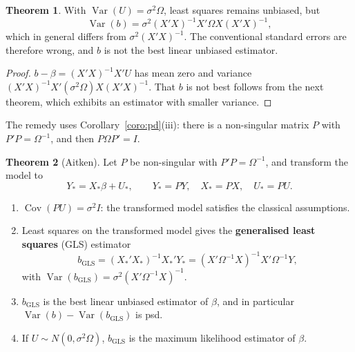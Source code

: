 \documentclass[11pt,a4paper]{article}
\numberwithin{equation}{section}
\DeclareMathOperator{\Var}{Var}
\DeclareMathOperator{\Cov}{Cov}
\theoremstyle{definition}
\newtheorem{thm}{Theorem}[subsection]
\begin{document}
\begin{thm}
\label{thm:olsnonsph}
With $\Var(U) = \sigma^2\Omega$, least squares remains unbiased, but
\[
\Var(b) = \sigma^2(X'X)^{-1}X'\Omega X(X'X)^{-1} ,
\]
which in general differs from $\sigma^2(X'X)^{-1}$. The conventional standard errors are therefore wrong, and $b$ is not the best linear unbiased estimator.
\end{thm}

\begin{proof}
$b - \beta = (X'X)^{-1}X'U$ has mean zero and variance $(X'X)^{-1}X'(\sigma^2\Omega)X(X'X)^{-1}$. That $b$ is not best follows from the next theorem, which exhibits an
estimator with smaller variance.
\end{proof}

The remedy uses Corollary~\ref{coro:pd}(iii): there is a non-singular matrix $P$ with $P'P = \Omega^{-1}$, and then $P\Omega P' = I$.

\begin{thm}[Aitken]
\label{thm:aitken}
Let $P$ be non-singular with $P'P = \Omega^{-1}$, and transform the model to
\[
Y_* = X_*\beta + U_*, \qquad Y_* = PY,\quad X_* = PX,\quad U_* = PU .
\]
\begin{enumerate}[label=(\roman*)]
\item $\Cov(PU) = \sigma^2I$: the transformed model satisfies the classical assumptions.
\item Least squares on the transformed model gives the \textbf{generalised least squares} (GLS) estimator
\[
b_{\text{GLS}} = (X_*'X_*)^{-1}X_*'Y_* = (X'\Omega^{-1}X)^{-1}X'\Omega^{-1}Y ,
\]
with $\Var(b_{\text{GLS}}) = \sigma^2(X'\Omega^{-1}X)^{-1}$.
\item $b_{\text{GLS}}$ is the best linear unbiased estimator of $\beta$, and in particular $\Var(b) - \Var(b_{\text{GLS}})$ is psd.
\item If $U \sim N(0, \sigma^2\Omega)$, $b_{\text{GLS}}$ is the maximum likelihood estimator of $\beta$.
\end{enumerate}
\end{thm}
\end{document}
